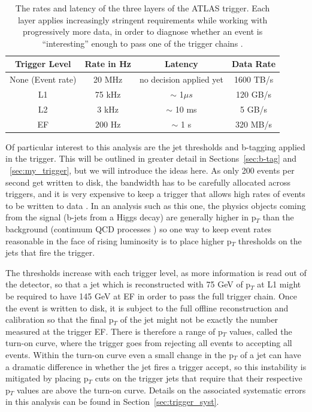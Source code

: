   

\begin{table}
\begin{tabular}{c | c | c | c}
Trigger Level & Rate in Hz  & Latency  & Data Rate\\  \hline
None (Event rate) & 20 MHz  & no decision applied yet & 1600 TB/s \\
L1  & 75 kHz  &  $\sim$ 1$\mu s$  & 120 GB/s\\
L2  & 3 kHz    & $\sim$ 10 ms & 5 GB/s \\
EF  &  200 Hz  & $\sim$ 1 s & 320 MB/s \\
\end{tabular}
\caption{The rates and latency of the three layers of the ATLAS trigger.  Each layer applies increasingly stringent requirements
while working with progressively more data, in order to diagnose whether an event is ``interesting'' enough to pass
one of the trigger chains \cite{atlas_trigger}. \label{tab:trigger_stats}}
\end{table}


Of particular interest to this analysis are the jet thresholds and b-tagging applied in the trigger.  This 
will be outlined in greater detail in Sections~\ref{sec:b-tag} and ~\ref{sec:my_trigger}, but we will introduce the ideas here.  As 
only 200 events per second get written to disk, the bandwidth has to be carefully allocated across triggers, 
and it is very expensive to keep a trigger that allows high rates of events to be written to data
.  In an analysis such as this one, the physics objects coming from the signal (b-jets 
from a Higgs decay) are generally higher in p$_T$ than the background (continuum QCD processes
) so one way to keep event rates reasonable in the face of rising luminosity is to place higher p$_T$ 
thresholds on the jets that fire the trigger.   

The thresholds increase with each trigger level, as more information is read out of the detector, so that 
a jet which is reconstructed with 75 GeV of p$_T$ at L1 
might be required to have 145 GeV at EF in order to pass the full trigger chain.  Once the event 
is written to disk, it is subject to the full offline reconstruction and calibration so that the final p$_T$ 
of the jet might not be exactly the number measured at the trigger EF.  There is therefore a range 
of p$_T$ values, called the turn-on curve, where the trigger goes from rejecting 
all events to accepting all events.  Within the turn-on curve even a small change in the p$_T$
of a jet can have a dramatic difference in whether the jet fires a trigger accept, so this 
instability is mitigated by placing p$_T$ cuts on the trigger jets that require that their respective p$_T$ 
values are above the turn-on curve.  Details on the associated systematic errors in this analysis 
can be found in Section~\ref{sec:trigger_syst}.  

